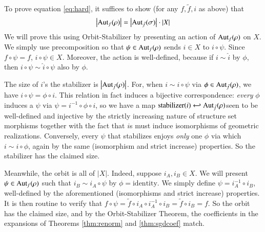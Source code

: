 \documentclass{article}
\theoremstyle{plain}
\theoremstyle{definition}
\newcommand{\Aut}{\text{\textnormal{Aut}}}
\newcommand{\wabs}[1]{\left|#1\right|}
\begin{document}
            To prove equation \ref{eq:hard}, it suffices to show (for any
            $f, \tilde f, i$ as above) that
            $$
                \wabs{\Aut_f(\rho)}
                =
                \wabs{\Aut_{\tilde f}(\sigma)}
                \cdot
                \wabs{X}
            $$
            We will prove this using Orbit-Stabilizer by presenting an
            action of $\Aut_f(\rho)$ on $X$.  We simply use precomposition so
            that $\psi\in \Aut_f(\rho)$ sends $i\in X$ to $i\circ \psi$.  Since
            $f\circ\psi = f$, $i\circ \psi \in X$.  Moreover, the action is
            well-defined, because if $i\sim \hat i$ by $\phi$, then 
            $i \circ \psi \sim \hat i \circ \psi$ also by $\phi$.
            
            The size of $i$'s the stabilizer is $\wabs{\Aut_{\tilde f}(\rho)}$.
            For, when $i \sim i \circ \psi$ via $\phi \in \Aut_{\tilde
            f}(\rho)$, we have $i\circ \psi = \phi \circ i$.  This relation in
            fact induces a bijective correspondence: \emph{every} $\phi$
            induces a $\psi$ via $\psi = i^{-1} \circ \phi \circ i$, so we have
            a map $\text{stabilizer}(i) \hookleftarrow \Aut_{\tilde f}(\rho)
            $seen to be well-defined and injective by the strictly increasing
            nature of structure set morphisms together with the fact that $i$s
            must induce isomorphisms of geometric realizations.  Conversely,
            every $\psi$ that stabilizes enjoys \emph{only} one $\phi$ via
            which $i \sim i \circ \phi$, again by the same (isomorphism and
            strict increase) properties.  So the stabilizer has the claimed
            size.

            Meanwhile, the orbit is all of $\wabs{X}$.  Indeed, suppose
            $i_A, i_B \in X$.  We will present $\psi \in \Aut_f(\rho)$ such
            that $i_B \sim i_A \circ \psi$ by $\phi=\text{identity}$.  We
            simply define $\psi = i_A^{-1} \circ i_B$, well-defined by the
            aforementioned (isomorphisms and strict increase) properties.
            It is then routine to verify that
            $
                f \circ \psi
                =
                \tilde f \circ i_A \circ i_A^{-1} \circ i_B
                =
                \tilde f \circ i_B
                = f.
            $
            So the orbit has the claimed size, and by the Orbit-Stabilizer
            Theorem, the coefficients in the expansions of Theorems 
            \ref{thm:renorm} and \ref{thm:sgdcoef} match.
\end{document}
